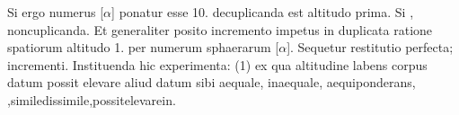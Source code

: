 \pend
\pstart
\vspace*{1em}
Si ergo numerus [$\alpha$] ponatur esse 10. decuplicanda est altitudo prima. Si , noncuplicanda. Et generaliter posito incremento\protect{} impetus\protect{} in duplicata ratione spatiorum  altitudo 1. per numerum sphaerarum [$\alpha$]. Sequetur restitutio perfecta\protect{};  incrementi\protect{}. Instituenda hic experimenta\protect{}: (1) ex qua altitudine labens corpus datum possit elevare aliud datum sibi aequale, inaequale, aequiponderans, ,\hfill simile\hfill dissimile,\hfill possit\hfill elevare\hfill in\hfill {}.
\pend
\pstart\noindent
\centering
